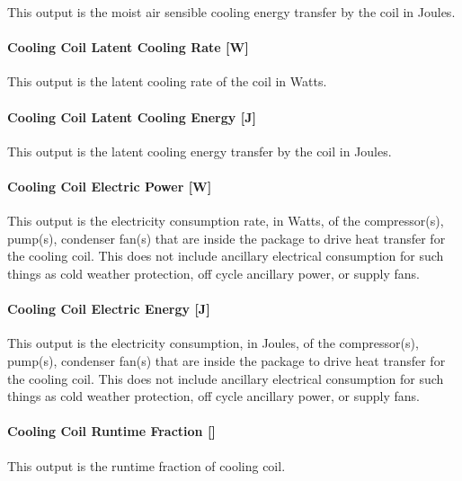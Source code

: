 This output is the moist air sensible cooling energy transfer by the coil in Joules.

\paragraph{Cooling Coil Latent Cooling Rate {[}W{]}}\label{cooling-coil-latent-cooling-rate-w-6}

This output is the latent cooling rate of the coil in Watts.

\paragraph{Cooling Coil Latent Cooling Energy {[}J{]}}\label{cooling-coil-latent-cooling-energy-j-8}

This output is the latent cooling energy transfer by the coil in Joules.

\paragraph{Cooling Coil Electric Power {[}W{]}}\label{cooling-coil-electric-power-w-4}

This output is the electricity consumption rate, in Watts, of the compressor(s), pump(s), condenser fan(s) that are inside the package to drive heat transfer for the cooling coil. This does not include ancillary electrical consumption for such things as cold weather protection, off cycle ancillary power, or supply fans.

\paragraph{Cooling Coil Electric Energy {[}J{]}}\label{cooling-coil-electric-energy-j-5}

This output is the electricity consumption, in Joules, of the compressor(s), pump(s), condenser fan(s) that are inside the package to drive heat transfer for the cooling coil. This does not include ancillary electrical consumption for such things as cold weather protection, off cycle ancillary power, or supply fans.

\paragraph{\texorpdfstring{Cooling Coil Runtime Fraction {[]}}{Cooling Coil Runtime Fraction }}\label{cooling-coil-runtime-fraction-8}

This output is the runtime fraction of cooling coil.

